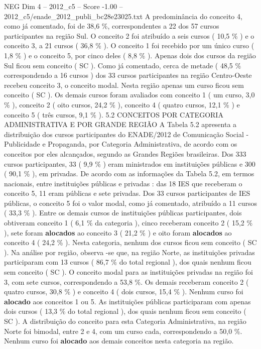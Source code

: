 \begin{textsample}{NEG Dim 4 – 2012\_c5 – Score -1.00 – 2012\_c5/enade\_2012\_publi\_bc28e23025.txt}
A predominância do conceito 4, como já comentado, foi de 38,6 \%, correspondentes a 22 dos 57 cursos participantes na região Sul.
O conceito 2 foi atribuído a seis cursos ( 10,5 \% ) e o conceito 3, a 21 cursos ( 36,8 \% ).
O conceito 1 foi recebido por um único curso ( 1,8 \% ) e o conceito 5, por cinco deles ( 8,8 \% ).
Apenas dois dos cursos da região Sul ficou sem conceito ( SC ).
Como já comentado, cerca de metade ( 48,5 \% correspondendo a 16 cursos ) dos 33 cursos participantes na região Centro-Oeste recebeu conceito 3, o conceito modal.
Nesta região apenas um curso ficou sem conceito ( SC ).
Os demais cursos foram avaliados com conceito 1 ( um curso, 3,0 \% ), conceito 2 ( oito cursos, 24,2 \% ), conceito 4 ( quatro cursos, 12,1 \% ) e conceito 5 ( três cursos, 9,1 \% ). 5.2 CONCEITOS POR CATEGORIA ADMINISTRATIVA E POR GRANDE REGIÃO A Tabela 5.2 apresenta a distribuição dos cursos participantes do ENADE/2012 de Comunicação Social - Publicidade e Propaganda, por Categoria Administrativa, de acordo com os conceitos por eles alcançados, segundo as Grandes Regiões brasileiras.
Dos 333 cursos participantes, 33 ( 9,9 \% ) eram ministrados em instituições públicas e 300 ( 90,1 \% ), em privadas.
De acordo com as informações da Tabela 5.2, em termos nacionais, entre instituições públicas e privadas : das 18 IES que receberam o conceito 5, 11 eram públicas e sete privadas.
Dos 33 cursos participantes de IES públicas, o conceito 5 foi o valor modal, como já comentado, atribuído a 11 cursos ( 33,3 \% ).
Entre os demais cursos de instituições públicas participantes, dois obtiveram conceito 1 ( 6,1 \% da categoria ), cinco receberam conceito 2 ( 15,2 \% ), sete foram \textbf{alocados} ao conceito 3 ( 21,2 \% ) e oito foram \textbf{alocados} ao conceito 4 ( 24,2 \% ).
Nesta categoria, nenhum dos cursos ficou sem conceito ( SC ).
Na análise por região, observa -se que, na região Norte, as instituições privadas participaram com 13 cursos ( 86,7 \% do total regional ), dos quais nenhum ficou sem conceito ( SC ).
O conceito modal para as instituições privadas na região foi 3, com sete cursos, correspondendo a 53,8 \%.
Os demais receberam conceito 2 ( quatro cursos, 30,8 \% ) e conceito 4 ( dois cursos, 15,4 \% ).
Nenhum curso foi \textbf{alocado} aos conceitos 1 ou 5.
As instituições públicas participaram com apenas dois cursos ( 13,3 \% do total regional ), dos quais nenhum ficou sem conceito ( SC ).
A distribuição do conceito para esta Categoria Administrativa, na região Norte foi bimodal, entre 2 e 4, com um curso cada, correspondendo a 50,0 \%.
Nenhum curso foi \textbf{alocado} aos demais conceitos nesta categoria na região.

\end{textsample}
